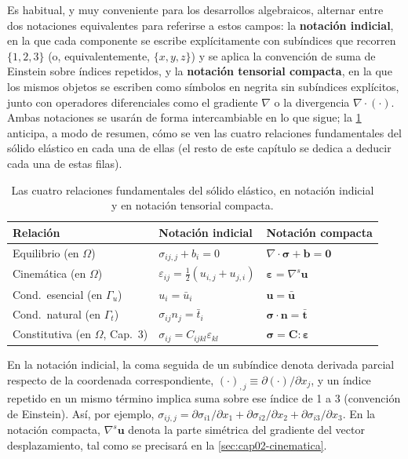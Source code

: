 Es habitual, y muy conveniente para los desarrollos algebraicos, alternar entre dos notaciones equivalentes para referirse a estos campos: la \textbf{notación indicial}, en la que cada componente se escribe explícitamente con subíndices que recorren $\{1,2,3\}$ (o, equivalentemente, $\{x,y,z\}$) y se aplica la convención de suma de Einstein sobre índices repetidos, y la \textbf{notación tensorial compacta}, en la que los mismos objetos se escriben como símbolos en negrita sin subíndices explícitos, junto con operadores diferenciales como el gradiente $\nabla$ o la divergencia $\nabla\cdot(\cdot)$. Ambas notaciones se usarán de forma intercambiable en lo que sigue; la \cref{tab:cap02-notaciones} anticipa, a modo de resumen, cómo se ven las cuatro relaciones fundamentales del sólido elástico en cada una de ellas (el resto de este capítulo se dedica a deducir cada una de estas filas).

\begin{table}[htbp]
\centering
\caption{Las cuatro relaciones fundamentales del sólido elástico, en notación indicial y en notación tensorial compacta.}
\label{tab:cap02-notaciones}
\begin{tabular}{@{}p{4.6cm}p{3.6cm}p{4.6cm}@{}}
\toprule
\textbf{Relación} & \textbf{Notación indicial} & \textbf{Notación compacta} \\
\midrule
Equilibrio (en $\Omega$) & $\sigma_{ij,j} + b_i = 0$ & $\nabla\cdot\bm\sigma + \bm b = \bm 0$ \\
Cinemática (en $\Omega$) & $\varepsilon_{ij} = \tfrac{1}{2}(u_{i,j}+u_{j,i})$ & $\bm\varepsilon = \nabla^{s}\bm u$ \\
Cond.\ esencial (en $\Gamma_u$) & $u_i = \bar u_i$ & $\bm u = \bar{\bm u}$ \\
Cond.\ natural (en $\Gamma_t$) & $\sigma_{ij}n_j = \bar t_i$ & $\bm\sigma\cdot\bm n = \bar{\bm t}$ \\
Constitutiva (en $\Omega$, Cap.\ 3) & $\sigma_{ij}=C_{ijkl}\varepsilon_{kl}$ & $\bm\sigma = \bm C:\bm\varepsilon$ \\
\bottomrule
\end{tabular}
\end{table}

En la notación indicial, la coma seguida de un subíndice denota derivada parcial respecto de la coordenada correspondiente, $(\cdot)_{,j} \equiv \partial(\cdot)/\partial x_j$, y un índice repetido en un mismo término implica suma sobre ese índice de 1 a 3 (convención de Einstein). Así, por ejemplo, $\sigma_{ij,j} = \partial\sigma_{i1}/\partial x_1 + \partial\sigma_{i2}/\partial x_2 + \partial\sigma_{i3}/\partial x_3$. En la notación compacta, $\nabla^{s}\bm u$ denota la parte simétrica del gradiente del vector desplazamiento, tal como se precisará en la \cref{sec:cap02-cinematica}.

